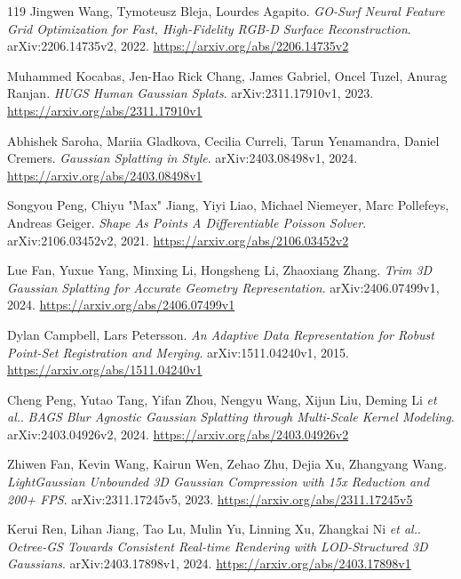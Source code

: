 \documentclass[11pt,a4paper]{article}
\begin{document}
\begin{thebibliography}{119}
Jingwen Wang, Tymoteusz Bleja, Lourdes Agapito.
\newblock \emph{GO-Surf Neural Feature Grid Optimization for Fast, High-Fidelity RGB-D Surface Reconstruction}.
\newblock arXiv:2206.14735v2, 2022.
\newblock \url{https://arxiv.org/abs/2206.14735v2}

Muhammed Kocabas, Jen-Hao Rick Chang, James Gabriel, Oncel Tuzel, Anurag Ranjan.
\newblock \emph{HUGS Human Gaussian Splats}.
\newblock arXiv:2311.17910v1, 2023.
\newblock \url{https://arxiv.org/abs/2311.17910v1}

Abhishek Saroha, Mariia Gladkova, Cecilia Curreli, Tarun Yenamandra, Daniel Cremers.
\newblock \emph{Gaussian Splatting in Style}.
\newblock arXiv:2403.08498v1, 2024.
\newblock \url{https://arxiv.org/abs/2403.08498v1}

Songyou Peng, Chiyu "Max" Jiang, Yiyi Liao, Michael Niemeyer, Marc Pollefeys, Andreas Geiger.
\newblock \emph{Shape As Points A Differentiable Poisson Solver}.
\newblock arXiv:2106.03452v2, 2021.
\newblock \url{https://arxiv.org/abs/2106.03452v2}

Lue Fan, Yuxue Yang, Minxing Li, Hongsheng Li, Zhaoxiang Zhang.
\newblock \emph{Trim 3D Gaussian Splatting for Accurate Geometry Representation}.
\newblock arXiv:2406.07499v1, 2024.
\newblock \url{https://arxiv.org/abs/2406.07499v1}

Dylan Campbell, Lars Petersson.
\newblock \emph{An Adaptive Data Representation for Robust Point-Set Registration and Merging}.
\newblock arXiv:1511.04240v1, 2015.
\newblock \url{https://arxiv.org/abs/1511.04240v1}

Cheng Peng, Yutao Tang, Yifan Zhou, Nengyu Wang, Xijun Liu, Deming Li \emph{et al.}.
\newblock \emph{BAGS Blur Agnostic Gaussian Splatting through Multi-Scale Kernel Modeling}.
\newblock arXiv:2403.04926v2, 2024.
\newblock \url{https://arxiv.org/abs/2403.04926v2}

Zhiwen Fan, Kevin Wang, Kairun Wen, Zehao Zhu, Dejia Xu, Zhangyang Wang.
\newblock \emph{LightGaussian Unbounded 3D Gaussian Compression with 15x Reduction and 200+ FPS}.
\newblock arXiv:2311.17245v5, 2023.
\newblock \url{https://arxiv.org/abs/2311.17245v5}

Kerui Ren, Lihan Jiang, Tao Lu, Mulin Yu, Linning Xu, Zhangkai Ni \emph{et al.}.
\newblock \emph{Octree-GS Towards Consistent Real-time Rendering with LOD-Structured 3D Gaussians}.
\newblock arXiv:2403.17898v1, 2024.
\newblock \url{https://arxiv.org/abs/2403.17898v1}


\end{thebibliography}
\end{document}
